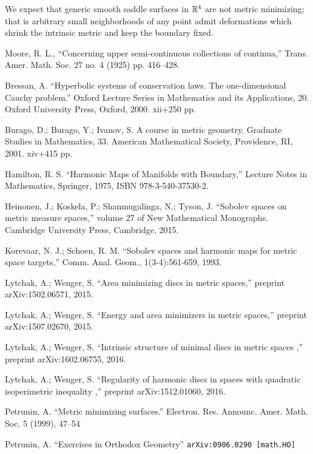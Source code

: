 \documentclass[a4paper,10pt]{amsart}
\begin{document}
We expect that generic smooth saddle surfaces in $\mathbb{R}^4$ are not metric minimizing; that is arbitrary small neighborhoods of any point admit deformations which shrink 
the intrinsic metric and keep the boundary fixed.




\begin{thebibliography}{52}
Moore, R. L.,
``Concerning upper semi-continuous collections of continua,''
Trans. Amer. Math. Soc. 27 no. 4 (1925) pp. 416--428.

 Bressan, A.
``Hyperbolic systems of conservation laws.
The one-dimensional Cauchy problem.'' 
Oxford Lecture Series in Mathematics and its Applications, 20. 
Oxford University Press, Oxford, 2000. 
xii+250 pp.

Burago, D.; Burago, Y.; Ivanov, S.
A course in metric geometry.
Graduate Studies in Mathematics, 33. American Mathematical Society, Providence, RI, 2001. xiv+415 pp.

 Hamilton, R. S. ``Harmonic Maps of Manifolds with Boundary,'' Lecture Notes in Mathematics, Springer, 1975, ISBN 978-3-540-37530-2.

 Heinonen, J.;  Koskela, P.;  Shanmugalinga, N.; Tyson, J. ``Sobolev spaces on metric measure spaces,''
volume 27 of New Mathematical Monographs. Cambridge University Press, Cambridge, 2015.

Korevaar, N. J.; Schoen, R. M. ``Sobolev spaces and harmonic maps for metric space targets,'' Comm. Anal. Geom., 1(3-4):561-659, 1993.

Lytchak, A.; Wenger, S. ``Area minimizing discs in metric spaces,'' preprint arXiv:1502.06571, 2015.

Lytchak, A.; Wenger, S. ``Energy and area minimizers in metric spaces,'' preprint  arXiv:1507.02670, 2015.

Lytchak, A.; Wenger, S. ``Intrinsic structure of minimal discs in metric spaces ,'' preprint  arXiv:1602.06755, 2016.

Lytchak, A.; Wenger, S. ``Regularity of harmonic discs in spaces with quadratic isoperimetric inequality  ,'' preprint  arXiv:1512.01060, 2016.

 Petrunin, A.
``Metric minimizing surfaces.''
Electron. Res. Announc. Amer. Math. Soc. 5 (1999), 47--54 

 Petrunin, A. 
``Exercises in Orthodox Geometry''
{\tt arXiv:0906.0290 [math.HO]}


\end{thebibliography}
\end{document}
